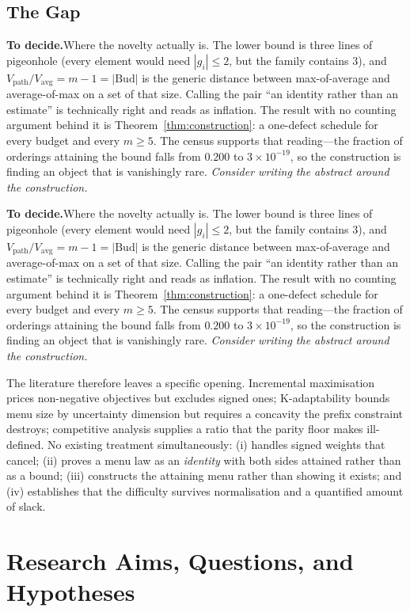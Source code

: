\documentclass[conference]{IEEEtran}
\theoremstyle{definition}
\newif\ifshownotes\shownotestrue
\newcommand{\TODOPAR}[1]{\ifshownotes\par\vspace{2pt}\noindent%
  {\color{todocol}\textsf{\footnotesize\textbf{To decide.}\;#1}}\par\vspace{2pt}\fi}
\begin{document}
\subsection{The Gap}
\TODOPAR{Where the novelty actually is. The lower bound is three lines of pigeonhole
(every element would need $|g_{i}|\le2$, but the family contains $3$), and
$V_{\mathrm{path}}/V_{\mathrm{avg}}=m-1=|\mathrm{Bud}|$ is the generic distance between
max-of-average and average-of-max on a set of that size. Calling the pair ``an identity rather
than an estimate'' is technically right and reads as inflation. The result with no counting
argument behind it is Theorem~\ref{thm:construction}: a one-defect schedule for every budget and
every $m\ge5$. The census supports that reading---the fraction of orderings attaining the
bound falls from $0.200$ to $3\times10^{-19}$, so the construction is finding an object that
is vanishingly rare. \emph{Consider writing the abstract around the construction.}}
\TODOPAR{Where the novelty actually is. The lower bound is three lines of pigeonhole
(every element would need $|g_{i}|\le2$, but the family contains $3$), and
$V_{\mathrm{path}}/V_{\mathrm{avg}}=m-1=|\mathrm{Bud}|$ is the generic distance between
max-of-average and average-of-max on a set of that size. Calling the pair ``an identity rather
than an estimate'' is technically right and reads as inflation. The result with no counting
argument behind it is Theorem~\ref{thm:construction}: a one-defect schedule for every budget and
every $m\ge5$. The census supports that reading---the fraction of orderings attaining the
bound falls from $0.200$ to $3\times10^{-19}$, so the construction is finding an object that
is vanishingly rare. \emph{Consider writing the abstract around the construction.}}

The literature therefore leaves a specific opening. Incremental maximisation prices
non-negative objectives but excludes signed ones; K-adaptability bounds menu size by
uncertainty dimension but requires a concavity the prefix constraint destroys; competitive
analysis supplies a ratio that the parity floor makes ill-defined. No existing treatment
simultaneously: (i) handles signed weights that cancel; (ii) proves a menu law as an
\emph{identity} with both sides attained rather than as a bound; (iii) constructs the
attaining menu rather than showing it exists; and (iv) establishes that the difficulty
survives normalisation and a quantified amount of slack.

\section{Research Aims, Questions, and Hypotheses}
\end{document}
